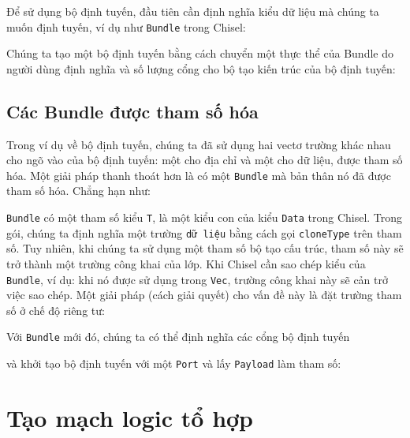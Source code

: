 \documentclass[%
    10pt,
    headinclude, footexclude,
    openright, %
    notitlepage,
    cleardoubleempty,
    headsepline,
    pointlessnumbers,
    bibtotoc, idxtotoc,
    ]{scrbook}
\newcommand{\code}[1]{{\small{\texttt{#1}}}}
\begin{document}

\noindent Để sử dụng bộ định tuyến, đầu tiên cần định nghĩa kiểu dữ liệu mà chúng ta muốn định tuyến, ví dụ như \code{Bundle} trong Chisel:


\noindent Chúng ta tạo một bộ định tuyến bằng cách chuyển một thực thể của Bundle do người dùng định nghĩa và số lượng cổng cho bộ tạo kiến trúc của bộ định tuyến: 


\subsection{Các Bundle được tham số hóa}

Trong ví dụ về bộ định tuyến, chúng ta đã sử dụng hai vectơ trường khác nhau cho ngõ vào của bộ định tuyến: một cho địa chỉ và một cho dữ liệu, được tham số hóa. Một giải pháp thanh thoát hơn là có một \code{Bundle} mà bản thân nó đã được tham số hóa. Chẳng hạn như: 


\code{Bundle} có một tham số kiểu \code{T}, là một kiểu con của kiểu \code{Data} trong Chisel. Trong gói, chúng ta định nghĩa một trường \code{dữ liệu} bằng cách gọi \code{cloneType} trên tham số. Tuy nhiên, khi chúng ta sử dụng một tham số bộ tạo cấu trúc, tham số này sẽ trở thành một trường công khai của lớp. Khi Chisel cần sao chép kiểu của \code{Bundle}, ví dụ: khi nó được sử dụng trong \code{Vec}, trường công khai này sẽ cản trở việc sao chép. Một giải pháp (cách giải quyết) cho vấn đề này là đặt trường tham số ở chế độ riêng tư: 


\noindent Với \code{Bundle} mới đó, chúng ta có thể định nghĩa các cổng bộ định tuyến


\noindent và khởi tạo bộ định tuyến với một \code{Port} và lấy \code{Payload} làm tham số:


\section{Tạo mạch logic tổ hợp}
\label{sec:gen:comb:logic}
\end{document}
